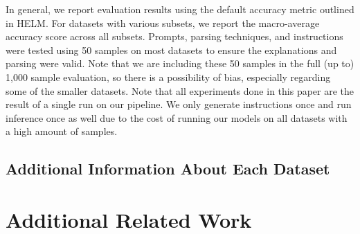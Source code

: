 In general, we report evaluation results using the default accuracy metric outlined in HELM. For datasets with various subsets, we report the macro-average accuracy score across all subsets. Prompts, parsing techniques, and instructions were tested using 50 samples on most datasets to ensure the explanations and parsing were valid. Note that we are including these 50 samples in the full (up to) 1,000 sample evaluation, so there is a possibility of bias, especially regarding some of the smaller datasets. Note that all experiments done in this paper are the result of a single run on our pipeline. We only generate instructions once and run inference once as well due to the cost of running our models on all datasets with a high amount of samples.

\subsection{Additional Information About Each Dataset}
\label{sec:info-about-each-dataset}



\section{Additional Related Work}
\label{sec:additional-related-work}


